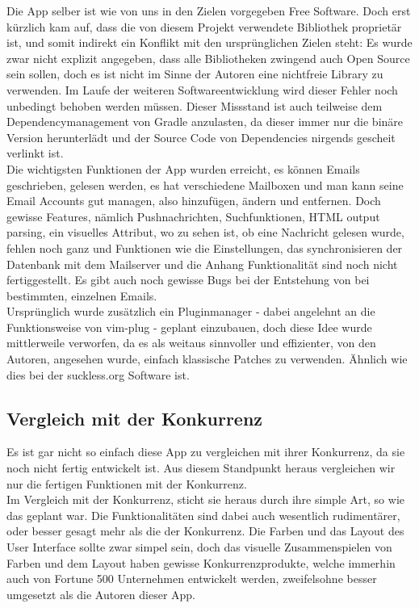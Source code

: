 \documentclass[a4paper,11pt]{article}
\begin{document}
Die App selber ist wie von uns in den Zielen vorgegeben Free Software. Doch erst kürzlich kam auf, dass die von diesem Projekt verwendete  Bibliothek proprietär ist, und somit indirekt ein Konflikt mit den ursprünglichen Zielen steht: Es wurde zwar nicht explizit angegeben, dass alle Bibliotheken zwingend auch Open Source sein sollen, doch es ist nicht im Sinne der Autoren eine nichtfreie Library zu verwenden. Im Laufe der weiteren Softwareentwicklung wird dieser Fehler noch unbedingt behoben werden müssen. Dieser Missstand ist auch teilweise dem Dependencymanagement von Gradle anzulasten, da dieser immer nur die binäre Version herunterlädt und der Source Code von Dependencies nirgends gescheit verlinkt ist.\\

Die wichtigsten Funktionen der App wurden erreicht, es können Emails geschrieben, gelesen werden, es hat verschiedene Mailboxen und man kann seine Email Accounts gut managen, also hinzufügen, ändern und entfernen. Doch gewisse Features, nämlich Pushnachrichten, Suchfunktionen, HTML output parsing, ein visuelles Attribut, wo zu sehen ist, ob eine Nachricht gelesen wurde, fehlen noch ganz und Funktionen wie die Einstellungen, das synchronisieren der Datenbank mit dem Mailserver und die Anhang Funktionalität sind noch nicht fertiggestellt. Es gibt auch noch gewisse Bugs bei der Entstehung von  \cite{edgecase} bei bestimmten, einzelnen Emails.\\

Ursprünglich wurde zusätzlich ein Pluginmanager - dabei angelehnt an die Funktionsweise von vim-plug\cite{plug} - geplant einzubauen, doch diese Idee wurde mittlerweile verworfen, da es als weitaus sinnvoller und effizienter, von den Autoren, angesehen wurde, einfach klassische Patches zu verwenden. Ähnlich wie dies bei der suckless.org Software ist. \cite{dwm}

\subsection{Vergleich mit der Konkurrenz}
Es ist gar nicht so einfach diese App zu vergleichen mit ihrer Konkurrenz, da sie noch nicht fertig entwickelt ist. Aus diesem Standpunkt heraus vergleichen wir nur die fertigen Funktionen mit der Konkurrenz.\\

Im Vergleich mit der Konkurrenz, sticht sie heraus durch ihre simple Art, so wie das geplant war. Die Funktionalitäten sind dabei auch wesentlich rudimentärer, oder besser gesagt mehr  als die der Konkurrenz. Die Farben und das Layout des User Interface sollte zwar simpel sein, doch das visuelle Zusammenspielen von Farben und dem Layout haben gewisse Konkurrenzprodukte, welche immerhin auch von Fortune 500 Unternehmen entwickelt werden, zweifelsohne besser umgesetzt als die Autoren dieser App.
\end{document}
